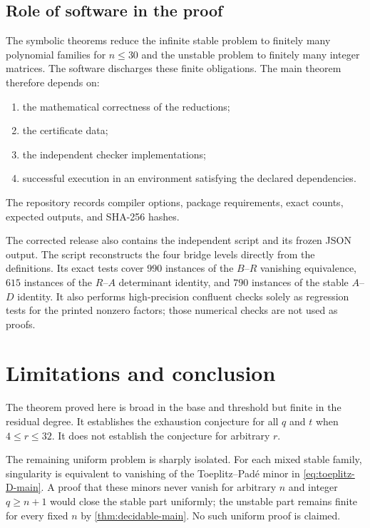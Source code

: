 \documentclass[11pt]{amsart}
\newcommand{\1}{\mathbf 1}
\theoremstyle{remark}
\begin{document}
\subsection{Role of software in the proof}
The symbolic theorems reduce the infinite stable problem to finitely many polynomial families for $n\le30$ and the unstable problem to finitely many integer matrices. The software discharges these finite obligations. The main theorem therefore depends on:
\begin{enumerate}[label=(\alph*)]
\item the mathematical correctness of the reductions;
\item the certificate data;
\item the independent checker implementations;
\item successful execution in an environment satisfying the declared dependencies.
\end{enumerate}
The repository records compiler options, package requirements, exact counts, expected outputs, and SHA-256 hashes.

The corrected release also contains the independent script
 and its frozen JSON output.  The script reconstructs the four bridge levels directly from the definitions.  Its exact tests cover $990$ instances of the $B$--$R$ vanishing equivalence, $615$ instances of the $R$--$A$ determinant identity, and $790$ instances of the stable $A$--$D$ identity.  It also performs high-precision confluent checks solely as regression tests for the printed nonzero factors; those numerical checks are not used as proofs.

\section{Limitations and conclusion}

The theorem proved here is broad in the base and threshold but finite in the residual degree. It establishes the exhaustion conjecture for all $q$ and $t$ when $4\le r\le32$. It does not establish the conjecture for arbitrary $r$.

The remaining uniform problem is sharply isolated. For each mixed stable family, singularity is equivalent to vanishing of the Toeplitz--Pad\'e minor in \eqref{eq:toeplitz-D-main}. A proof that these minors never vanish for arbitrary $n$ and integer $q\ge n+1$ would close the stable part uniformly; the unstable part remains finite for every fixed $n$ by \cref{thm:decidable-main}. No such uniform proof is claimed.
\end{document}
